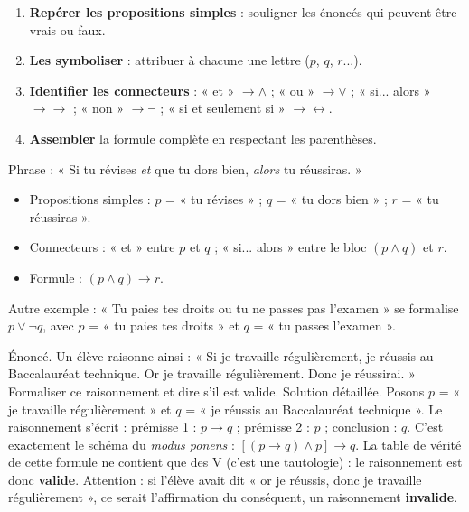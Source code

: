\documentclass[11pt]{article}
\begin{document}
\begin{methode}
\begin{enumerate}
\item \textbf{Repérer les propositions simples} : souligner les énoncés qui peuvent être vrais ou faux.
\item \textbf{Les symboliser} : attribuer à chacune une lettre ($p$, $q$, $r$...).
\item \textbf{Identifier les connecteurs} : « et » $\to \wedge$ ; « ou » $\to \vee$ ; « si... alors » $\to \to$ ; « non » $\to \neg$ ; « si et seulement si » $\to \leftrightarrow$.
\item \textbf{Assembler} la formule complète en respectant les parenthèses.
\end{enumerate}
\end{methode}

\begin{exemplebox}
Phrase : « Si tu révises \emph{et} que tu dors bien, \emph{alors} tu réussiras. »
\begin{itemize}
\item Propositions simples : $p$ = « tu révises » ; $q$ = « tu dors bien » ; $r$ = « tu réussiras ».
\item Connecteurs : « et » entre $p$ et $q$ ; « si... alors » entre le bloc $(p \wedge q)$ et $r$.
\item Formule : $(p \wedge q) \to r$.
\end{itemize}
Autre exemple : « Tu paies tes droits ou tu ne passes pas l'examen » se formalise $p \vee \neg q$, avec $p$ = « tu paies tes droits » et $q$ = « tu passes l'examen ».
\end{exemplebox}

\begin{exoresolu}
Énoncé. Un élève raisonne ainsi : « Si je travaille régulièrement, je réussis au Baccalauréat technique. Or je travaille régulièrement. Donc je réussirai. » Formaliser ce raisonnement et dire s'il est valide.
\tcblower
Solution détaillée. Posons $p$ = « je travaille régulièrement » et $q$ = « je réussis au Baccalauréat technique ». Le raisonnement s'écrit : prémisse 1 : $p \to q$ ; prémisse 2 : $p$ ; conclusion : $q$. C'est exactement le schéma du \emph{modus ponens} : $[(p \to q) \wedge p] \to q$. La table de vérité de cette formule ne contient que des V (c'est une tautologie) : le raisonnement est donc \textbf{valide}. Attention : si l'élève avait dit « or je réussis, donc je travaille régulièrement », ce serait l'affirmation du conséquent, un raisonnement \textbf{invalide}.
\end{exoresolu}
\end{document}
